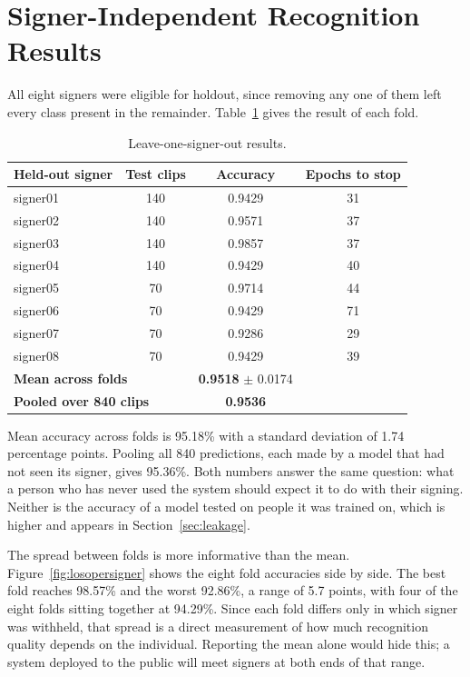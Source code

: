 \section{Signer-Independent Recognition Results}
\label{sec:losoresults}

All eight signers were eligible for holdout, since removing any one of them left every class present in the remainder. Table~\ref{tab:folds} gives the result of each fold.

\begin{table}[htbp]
    \centering
    \caption{Leave-one-signer-out results.}
    \label{tab:folds}
    \begin{tabular}{lccc}
        \toprule
        \textbf{Held-out signer} & \textbf{Test clips} & \textbf{Accuracy} & \textbf{Epochs to stop} \\
        \midrule
        signer01 & 140 & 0.9429 & 31 \\
        signer02 & 140 & 0.9571 & 37 \\
        signer03 & 140 & 0.9857 & 37 \\
        signer04 & 140 & 0.9429 & 40 \\
        signer05 & 70  & 0.9714 & 44 \\
        signer06 & 70  & 0.9429 & 71 \\
        signer07 & 70  & 0.9286 & 29 \\
        signer08 & 70  & 0.9429 & 39 \\
        \midrule
        \multicolumn{2}{l}{\textbf{Mean across folds}}      & \textbf{0.9518} $\pm$ 0.0174 & \\
        \multicolumn{2}{l}{\textbf{Pooled over 840 clips}}  & \textbf{0.9536} & \\
        \bottomrule
    \end{tabular}
\end{table}

\noindent Mean accuracy across folds is 95.18\% with a standard deviation of 1.74 percentage points. Pooling all 840 predictions, each made by a model that had not seen its signer, gives 95.36\%. Both numbers answer the same question: what a person who has never used the system should expect it to do with their signing. Neither is the accuracy of a model tested on people it was trained on, which is higher and appears in Section~\ref{sec:leakage}.

The spread between folds is more informative than the mean. Figure~\ref{fig:losopersigner} shows the eight fold accuracies side by side. The best fold reaches 98.57\% and the worst 92.86\%, a range of 5.7 points, with four of the eight folds sitting together at 94.29\%. Since each fold differs only in which signer was withheld, that spread is a direct measurement of how much recognition quality depends on the individual. Reporting the mean alone would hide this; a system deployed to the public will meet signers at both ends of that range.

